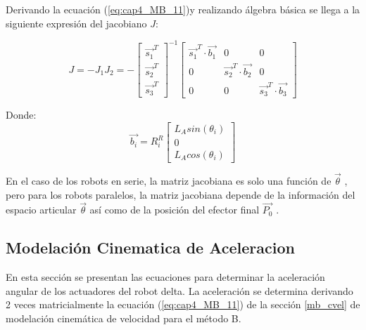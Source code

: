     
    Derivando la ecuación (\ref{eq:cap4_MB_11})y realizando álgebra básica se llega a la siguiente expresión del jacobiano $J$: 
    
    \begin{equation}
        J = -J_{1}J_{2}=-
        {\begin{bmatrix}
                \overrightarrow{s_{1}}^T \\
                \overrightarrow{s_{2}}^T \\
                \overrightarrow{s_{3}}^T
            \end{bmatrix}}^{-1}
        {\begin{bmatrix}
                \overrightarrow{s_{1}}^{T} \cdot \overrightarrow{b_{1}} &0&0\\
                0 &\overrightarrow{s_{2}}^{T}\cdot \overrightarrow{b_{2}}&0\\
                0 &0&\overrightarrow{s_{3}}^{T}\cdot \overrightarrow{b_{3}}
            \end{bmatrix}}
        \label{eq:cap4_MB_14}
    \end{equation}  
    
    Donde:
    \begin{equation}
        \overrightarrow{b_{i}} = R_{i}^{R}             
        \begin{bmatrix}
                L_{A} sin(\theta_i) \\
                0\\
                L_{A} cos(\theta_i) 
            \end{bmatrix}
        \label{eq:cap4_MB_15}
    \end{equation}  
    
    En el caso de los robots en serie, la matriz jacobiana es solo una función de $\overrightarrow{\theta}$   , pero para los robots paralelos, la matriz jacobiana depende de la información del espacio articular $\overrightarrow{\theta}$   así como de la posición del efector final $\overrightarrow{P_0}$   .
        \newpage

    \subsection{Modelación Cinematica de Aceleracion}
        
        En esta sección se presentan las ecuaciones para determinar la aceleración angular de los actuadores del robot delta. La aceleración se determina derivando 2 veces matricialmente la ecuación (\ref{eq:cap4_MB_11}) de la sección \ref{mb_cvel} de modelación cinemática de velocidad para el método B.
        
